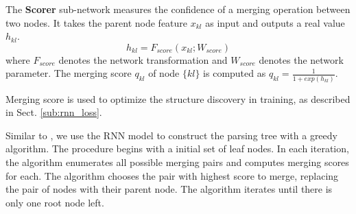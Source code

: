 \documentclass[10pt,twocolumn,letterpaper]{article}
\begin{document}
The \textbf{Scorer} sub-network measures the confidence of a merging operation between two nodes. It takes the parent node feature $x_{kl}$ as input and outputs a real value $h_{kl}$.
\vspace{-1mm}
\begin{equation}\label{eq_node_score}
h_{kl} = F_{score}(x_{kl};W_{score})
\end{equation}
where $F_{score}$ denotes the network transformation and $W_{score}$ denotes the network parameter. The merging score $q_{kl}$ of node $\{kl\}$ is computed as $q_{kl} = \frac{1}{1+exp(h_{kl})}$.

Merging score is used to optimize the structure discovery in training, as described in Sect. \ref{sub:rnn_loss}.

Similar to \cite{DBLP:Recursive_Socher}, we use the RNN model to construct the parsing tree with a greedy algorithm. The procedure begins with a initial set of leaf nodes. In each iteration, the algorithm enumerates all possible merging pairs and computes merging scores for each. The algorithm chooses the pair with highest score to merge, replacing the pair of nodes with their parent node. The algorithm iterates until there is only one root node left.


\end{document}
